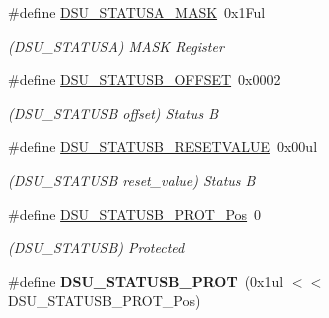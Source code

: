\begin{DoxyCompactItemize}
\item 
\hypertarget{group___s_a_m_l21___d_s_u_ga054a84324fddaaecb1b58f35c2314bc7}{}\#define \hyperlink{group___s_a_m_l21___d_s_u_ga054a84324fddaaecb1b58f35c2314bc7}{D\+S\+U\+\_\+\+S\+T\+A\+T\+U\+S\+A\+\_\+\+M\+A\+S\+K}~0x1\+Ful\label{group___s_a_m_l21___d_s_u_ga054a84324fddaaecb1b58f35c2314bc7}

\begin{DoxyCompactList}\small\item\em (D\+S\+U\+\_\+\+S\+T\+A\+T\+U\+S\+A) M\+A\+S\+K Register \end{DoxyCompactList}\item 
\hypertarget{group___s_a_m_l21___d_s_u_ga6633a1098b38470e1cefd46795f0cf93}{}\#define \hyperlink{group___s_a_m_l21___d_s_u_ga6633a1098b38470e1cefd46795f0cf93}{D\+S\+U\+\_\+\+S\+T\+A\+T\+U\+S\+B\+\_\+\+O\+F\+F\+S\+E\+T}~0x0002\label{group___s_a_m_l21___d_s_u_ga6633a1098b38470e1cefd46795f0cf93}

\begin{DoxyCompactList}\small\item\em (D\+S\+U\+\_\+\+S\+T\+A\+T\+U\+S\+B offset) Status B \end{DoxyCompactList}\item 
\hypertarget{group___s_a_m_l21___d_s_u_gaef2faaac59541260b63b58569da04dee}{}\#define \hyperlink{group___s_a_m_l21___d_s_u_gaef2faaac59541260b63b58569da04dee}{D\+S\+U\+\_\+\+S\+T\+A\+T\+U\+S\+B\+\_\+\+R\+E\+S\+E\+T\+V\+A\+L\+U\+E}~0x00ul\label{group___s_a_m_l21___d_s_u_gaef2faaac59541260b63b58569da04dee}

\begin{DoxyCompactList}\small\item\em (D\+S\+U\+\_\+\+S\+T\+A\+T\+U\+S\+B reset\+\_\+value) Status B \end{DoxyCompactList}\item 
\hypertarget{group___s_a_m_l21___d_s_u_gacd0a6b404b8ba52afe784b653e1b4ee7}{}\#define \hyperlink{group___s_a_m_l21___d_s_u_gacd0a6b404b8ba52afe784b653e1b4ee7}{D\+S\+U\+\_\+\+S\+T\+A\+T\+U\+S\+B\+\_\+\+P\+R\+O\+T\+\_\+\+Pos}~0\label{group___s_a_m_l21___d_s_u_gacd0a6b404b8ba52afe784b653e1b4ee7}

\begin{DoxyCompactList}\small\item\em (D\+S\+U\+\_\+\+S\+T\+A\+T\+U\+S\+B) Protected \end{DoxyCompactList}\item 
\hypertarget{group___s_a_m_l21___d_s_u_ga0ba62e190f2b944deffdbfc40a7ce33a}{}\#define {\bfseries D\+S\+U\+\_\+\+S\+T\+A\+T\+U\+S\+B\+\_\+\+P\+R\+O\+T}~(0x1ul $<$$<$ D\+S\+U\+\_\+\+S\+T\+A\+T\+U\+S\+B\+\_\+\+P\+R\+O\+T\+\_\+\+Pos)\label{group___s_a_m_l21___d_s_u_ga0ba62e190f2b944deffdbfc40a7ce33a}


\end{DoxyCompactItemize}
